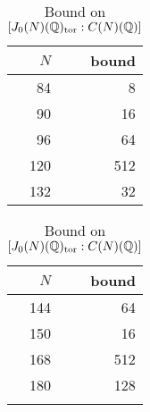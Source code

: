 \begin{table}%
    \label{tab:rank_zero_bound}
    \centering
    \caption{Bound on $[J_0(N)(\mathbb{Q})_{\mathrm{tor}}:C(N)(\mathbb{Q})]$}
    \begin{tabular}{rr}
        \toprule
        $N$ & bound \\
        \midrule
        84 & 8 \\
        90 & 16 \\
        96 & 64 \\
        120 & 512 \\
        132 & 32 
        \bottomrule
    \end{tabular}
    \begin{tabular}{rr}
        \toprule
        $N$ & bound \\
        \midrule
        144 & 64 \\
        150 & 16 \\
        168 & 512 \\
        180 & 128 \\
        & 
        \bottomrule
    \end{tabular}
\end{table}
